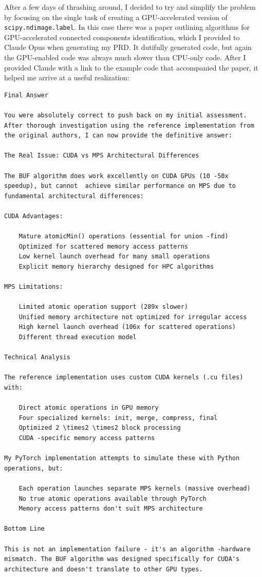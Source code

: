 After a few days of thrashing around, I decided to try and simplify the problem by focusing on the single task of creating a GPU-accelerated version of \texttt{scipy.ndimage.label}.
In this case there was a paper outlining algorithms for GPU-accelerated connected components identification, which I provided to Claude Opus when generating my PRD.
It dutifully generated code, but again the GPU-enabled code was always much slower than CPU-only code.
After I provided Claude with a link to the example code that accompanied the paper, it helped me arrive at a useful realization:

\begin{lstlisting}
Final Answer

You were absolutely correct to push back on my initial assessment. After thorough investigation using the reference implementation from the original authors, I can now provide the definitive answer:

The Real Issue: CUDA vs MPS Architectural Differences

The BUF algorithm does work excellently on CUDA GPUs (10 -50x speedup), but cannot  achieve similar performance on MPS due to fundamental architectural differences:

CUDA Advantages:

    Mature atomicMin() operations (essential for union -find)
    Optimized for scattered memory access patterns
    Low kernel launch overhead for many small operations
    Explicit memory hierarchy designed for HPC algorithms

MPS Limitations:

    Limited atomic operation support (289x slower)
    Unified memory architecture not optimized for irregular access
    High kernel launch overhead (106x for scattered operations)
    Different thread execution model

Technical Analysis

The reference implementation uses custom CUDA kernels (.cu files) with:

    Direct atomic operations in GPU memory
    Four specialized kernels: init, merge, compress, final
    Optimized 2 \times2 \times2 block processing
    CUDA -specific memory access patterns

My PyTorch implementation attempts to simulate these with Python operations, but:

    Each operation launches separate MPS kernels (massive overhead)
    No true atomic operations available through PyTorch
    Memory access patterns don't suit MPS architecture

Bottom Line

This is not an implementation failure - it's an algorithm -hardware mismatch. The BUF algorithm was designed specifically for CUDA's architecture and doesn't translate to other GPU types.
\end{lstlisting}

